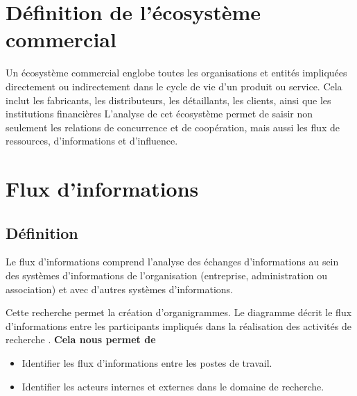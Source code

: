 \documentclass[edit,12pt,a4paper,ChapStyle,oneside,doubleinterligne]{report}
\begin{document}
\section{Définition de l'écosystème commercial}
Un écosystème commercial englobe toutes les organisations et entités impliquées directement ou indirectement dans le cycle de vie d'un produit ou service. Cela inclut les fabricants, les distributeurs, les détaillants, les clients, ainsi que les institutions financières L'analyse de cet écosystème permet de saisir non seulement les relations de concurrence et de coopération, mais aussi les flux de ressources, d'informations et d'influence\cite{1}.
\section{Flux d'informations}
\subsection{Définition}


Le flux d'informations comprend l'analyse des échanges d'informations au sein des systèmes d'informations de l'organisation (entreprise, administration ou association) et avec d'autres systèmes d'informations.


Cette recherche permet la création d'organigrammes. Le diagramme décrit le flux d'informations entre les participants impliqués dans la réalisation des activités de recherche \cite{flux}.
\textbf{Cela nous permet de}
\begin{itemize}
    \item Identifier les flux d'informations entre les postes de travail.
    \item Identifier les acteurs internes et externes dans le domaine de recherche.
\end{itemize}
\end{document}
